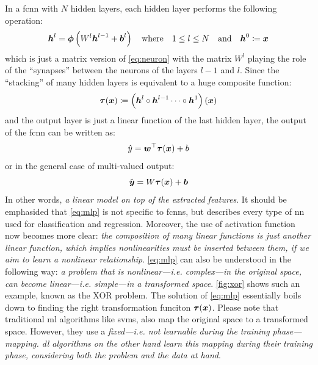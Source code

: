 In a \gls{fcnn} with $N$ hidden layers, each hidden layer performs the following
operation:
\begin{equation}
	\boldsymbol{h}^{l} =
	\boldsymbol{\phi}\left({W^l \boldsymbol{h}^{l-1} + \boldsymbol{b}^l}\right)
	\quad
	\text{where}
	\quad
	1 \leq l \leq N
	\quad
	\text{and}
	\quad
	\boldsymbol{h}^0 \coloneqq \boldsymbol{x}
\end{equation}
which is just a matrix version of \Equation{} \ref{eq:neuron} with the matrix $W^l$
playing the role of the ``synapses'' between the
neurons of the layers $l-1$ and $l$. Since the ``stacking'' of
many hidden layers is equivalent to a huge composite function:
\begin{equation}
	\boldsymbol{\tau}(\boldsymbol{x}) \coloneqq
	\left(\boldsymbol{h}^l \circ \boldsymbol{h}^{l-1}
	\cdots
	\circ \boldsymbol{h}^{1}\right)(\boldsymbol{x})
\end{equation}
and the output layer is just a linear function of the last hidden
layer, the output of the \gls{fcnn} can be written as:
\begin{equation}
	\hat{y} =
	\boldsymbol{w}^\top \boldsymbol{\tau}(\boldsymbol{x}) + b
\end{equation}
or in the general case of multi-valued output:
\begin{equation}
	\label{eq:mlp}
	\hat{\boldsymbol{y}} =
	W\boldsymbol{\tau}(\boldsymbol{x}) + \boldsymbol{b}
\end{equation}
In other words, \emph{a linear model on top of the extracted
features}. It should be emphasided that \Equation{}
\ref{eq:mlp} is not specific to \glspl{fcnn}, but describes every type of
\gls{nn} used for classification and
regression. Moreover, the use of activation function
now becomes more clear: \emph{the composition of many linear functions is
just another linear function, which implies nonlinearities must be inserted
between them, if we aim to learn a nonlinear relationship}. \Equation{}
\ref{eq:mlp} can also be understood in the following way: \emph{a problem that
is nonlinear---i.e. complex---in the original space, can become linear---i.e.
simple---in a transformed space}. \Figure{} \ref{fig:xor} shows such an example,
known as the XOR problem. The solution of \Equation{}
\ref{eq:mlp} essentially boils down to finding the right transformation funciton
$\boldsymbol{\tau}(\boldsymbol{x})$. Please note that traditional \gls{ml} algorithms like
\glspl{svm}, also map the original space to a transformed space. However, they
use a \emph{fixed---i.e. not learnable during the training phase---mapping. \Acrlong{dl} algorithms on the other hand
learn this mapping during their training phase, considering both the problem and
the data at hand}.

